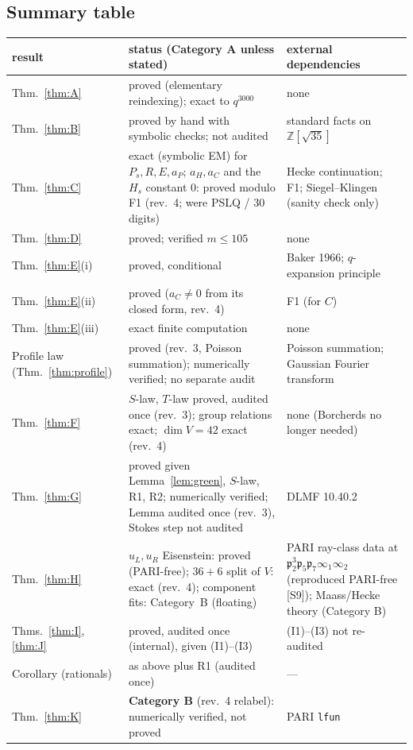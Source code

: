\documentclass[11pt]{article}
\theoremstyle{definition}
\newcommand{\Z}{\mathbb{Z}}
\newcommand{\fp}{\mathfrak{p}}
\newcommand{\src}[1]{\textup{[S#1]}}
\begin{document}
\subsection{Summary table}
\begin{center}\small
\begin{longtable}{p{2.6cm}p{6.6cm}p{5.6cm}}\toprule
result & status (Category A unless stated) & external dependencies\\\midrule\endhead
Thm.~\ref{thm:A} & proved (elementary reindexing); exact to $q^{3000}$ & none\\
Thm.~\ref{thm:B} & proved by hand with symbolic checks; not audited & standard facts on $\Z[\sqrt{35}]$\\
Thm.~\ref{thm:C} & exact (symbolic EM) for $P_s,R,E,a_P$; $a_H,a_C$ and the $H_s$ constant $0$: proved modulo F1 (rev.~4; were PSLQ / 30 digits) & Hecke continuation; F1; Siegel--Klingen (sanity check only)\\
Thm.~\ref{thm:D} & proved; verified $m\le105$ & none\\
Thm.~\ref{thm:E}(i) & proved, conditional & Baker 1966; $q$-expansion principle\\
Thm.~\ref{thm:E}(ii) & proved ($a_C\neq0$ from its closed form, rev.~4) & F1 (for $C$)\\
Thm.~\ref{thm:E}(iii) & exact finite computation & none\\
Profile law (Thm.~\ref{thm:profile}) & proved (rev.~3, Poisson summation); numerically verified; no separate audit & Poisson summation; Gaussian Fourier transform\\
Thm.~\ref{thm:F} & $S$-law, $T$-law proved, audited once (rev.~3); group relations exact; $\dim V=42$ exact (rev.~4) & none (Borcherds no longer needed)\\
Thm.~\ref{thm:G} & proved given Lemma~\ref{lem:green}, $S$-law, R1, R2; numerically verified; Lemma audited once (rev.~3), Stokes step not audited & DLMF 10.40.2\\
Thm.~\ref{thm:H} & $u_L,u_R$ Eisenstein: proved (PARI-free); $36+6$ split of $V$: exact (rev.~4); component fits: Category~B (floating) & PARI ray-class data at $\fp_2^3\fp_5\fp_7\infty_1\infty_2$ (reproduced PARI-free \src{9}); Maass/Hecke theory (Category B)\\
Thms.~\ref{thm:I}, \ref{thm:J} & proved, audited once (internal), given (I1)--(I3) & (I1)--(I3) not re-audited\\
Corollary (rationals) & as above plus R1 (audited once) & ---\\
Thm.~\ref{thm:K} & \textbf{Category B} (rev.~4 relabel): numerically verified, not proved & PARI \texttt{lfun}\\

\end{longtable}
\end{center}
\end{document}

